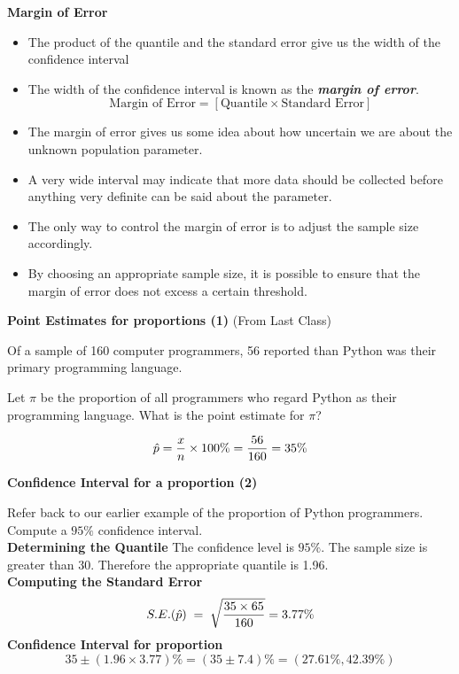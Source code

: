 

\noindent \textbf{Margin of Error}

\begin{itemize}
\item The product of the quantile and the standard error give us the width of the confidence interval
\item The width of the confidence interval is known as the \textbf{\emph{margin of error}}.  \[ \mbox{Margin of Error}  = \left[ \mbox{Quantile} \times \mbox{Standard Error} \right] \]
\item The margin of error gives us some idea about how uncertain we are about the unknown population parameter. \item A very wide interval may indicate that more data should be collected before anything very definite can be said about the parameter.
\item The only way to control the margin of error is to adjust the sample size accordingly.
\item By choosing an appropriate sample size, it is possible to ensure that the margin of error does not excess a certain threshold.
\end{itemize}



{
\noindent \textbf{Point Estimates for proportions (1) }
(From Last Class)

Of a sample of 160 computer programmers, 56 reported than Python was their primary programming language.

Let $\pi$ be the proportion of all programmers who regard Python as their programming language. What is the point estimate for $\pi$?

\[
\hat{p} = \frac{x}{n} \times 100\%  = {56 \over 160} = 35\%
\]
}

{
\noindent \textbf{Confidence Interval for a proportion (2) }

Refer back to our earlier example of the proportion of Python programmers. Compute a $95\%$ confidence interval.\\


\textbf{Determining the Quantile}
The confidence level is $95\%$. The sample size is greater than 30. Therefore the appropriate quantile is 1.96.\\
\bigskip
\textbf{Computing the Standard Error}
\[
S.E. (\hat{p}) \;=\; \sqrt{ {35 \times 65 \over 160 }} =  3.77\%
\] \bigskip
\textbf{Confidence Interval for proportion}
\[
35 \pm (1.96 \times 3.77) \%  = (35 \pm7.4) \% = (27.61\%,42.39\%)
\]
}

